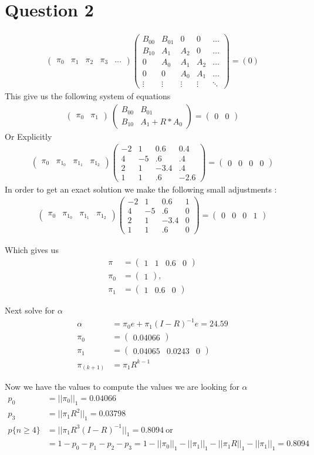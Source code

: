 \documentclass[fleqn]{article}
\newcommand{\mm}[1]{\begin{pmatrix}#1\end{pmatrix}}
\newcommand{\nn}[1]{ \begin{align*}#1\end{align*}}
\begin{document}
 \section*{Question 2}
\nn{
	 \mm{ \pi_0 & \pi_1 & \pi_2 & \pi_3 & \ldots }
	 \mm{
	  	B_{00} & B_{01} & 0 & 0 & \ldots\\
	  	B_{10} & A_1 & A_2 & 0  & \ldots\\ 
	  	0      & A_0 & A_1 & A_2 & \ldots\\ 
	  	0      & 0   & A_0 & A_1 & \ldots\\
	 	\vdots&\vdots&\vdots&\vdots&\ddots  
	 } = (0) 
}
This give us the following system of equations
\nn{
	\mm{\pi_0&\pi_1}\ \mm{
		 B_{00} & B_{01} \\ 
		 B_{10} & A_{1} + R * A_{0}
	}=\mm{0&0}
}
Or Explicitly 
\nn{
	\mm{\pi_{0} & \pi_{1_0} & \pi_{1_1} & \pi_{1_2}} 
 	\mm{-2&1&0.6&0.4\\ 4&-5&.6&.4\\2&1&-3.4&.4\\1&1&.6&-2.6} = \mm{0&0&0&0}
}
In order to get an exact solution we make the following small adjustments : 
 \nn{
 	\mm{\pi_{0} & \pi_{1_0} & \pi_{1_1} & \pi_{1_2}} 
 	\mm{-2&1&0.6&1\\ 4&-5&.6&0\\2&1&-3.4&0\\1&1&.6&0} = \mm{0&0&0&1}
 }
 
Which gives us
\nn{
    \pi   &= \mm{ 1&1&0.6&0} \\
    \pi_0 &= \mm{1}, \\
    \pi_1 &= \mm{1&0.6&0}
}

Next solve for $\alpha$ 
\nn{
    \alpha &= \pi_0 e  + \pi_1( I - R )^{-1}e = 24.59\\
    \pi_0 &= \mm{0.04066}\\
    \pi_1 &= \mm{0.04065 & 0.0243 & 0 }\\
    \pi_{(k+1)} &= \pi_{1}R^{k-1} 
}
 
Now we have the values to compute the values we are
looking for $\alpha$
\nn{
     p_0           &= ||\pi_{0}||_1 = \boxed{ 0.04066 } \\
     p_3           &= ||\pi_1R^2||_1 = \boxed { 0.03798 } \\
     p\{n \geq 4\} &= ||\pi_1R^{3}(I-R)^{-1}||_1 = 0.8094 \ \mbox{or}\\
      &=1 - p_0 - p_1 - p_2 - p_3 = 1 - ||\pi_{0}||_1 -
    ||\pi_{1}||_1 - ||\pi_{1}R||_1 - ||\pi_{1}||_1 =\boxed{0.8094}
 }
\end{document}

